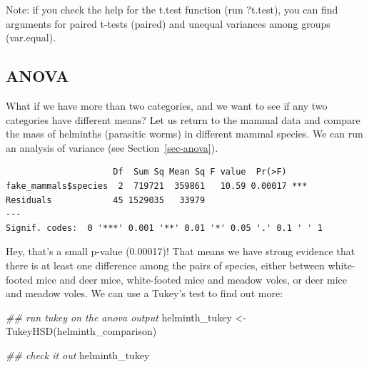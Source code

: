 \documentclass[
  letterpaper,
  DIV=11,
  numbers=noendperiod]{scrreprt}
\newenvironment{Shaded}{\begin{snugshade}}{\end{snugshade}}
\newcommand{\DocumentationTok}[1]{\textcolor[rgb]{0.37,0.37,0.37}{\textit{#1}}}
\newcommand{\FunctionTok}[1]{\textcolor[rgb]{0.28,0.35,0.67}{#1}}
\newcommand{\NormalTok}[1]{\textcolor[rgb]{0.00,0.23,0.31}{#1}}
\newcommand{\OtherTok}[1]{\textcolor[rgb]{0.00,0.23,0.31}{#1}}
\newcommand{\SpecialCharTok}[1]{\textcolor[rgb]{0.37,0.37,0.37}{#1}}
\begin{document}
Note: if you check the help for the t.test function (run ?t.test), you
can find arguments for paired t-tests (paired) and unequal variances
among groups (var.equal).

\subsection{ANOVA}\label{anova}

What if we have more than two categories, and we want to see if any two
categories have different means? Let us return to the mammal data and
compare the mass of helminths (parasitic worms) in different mammal
species. We can run an analysis of variance (see
Section~\ref{sec-anova}).

\begin{Shaded}
\end{Shaded}

\begin{verbatim}
                     Df  Sum Sq Mean Sq F value  Pr(>F)    
fake_mammals$species  2  719721  359861   10.59 0.00017 ***
Residuals            45 1529035   33979                    
---
Signif. codes:  0 '***' 0.001 '**' 0.01 '*' 0.05 '.' 0.1 ' ' 1
\end{verbatim}

Hey, that's a small p-value (0.00017)! That means we have strong
evidence that there is at least one difference among the pairs of
species, either between white-footed mice and deer mice, white-footed
mice and meadow voles, or deer mice and meadow voles. We can use a
Tukey's test to find out more:

\begin{Shaded}
\begin{Highlighting}[]
\DocumentationTok{\#\# run tukey on the anova output}
\NormalTok{helminth\_tukey }\OtherTok{\textless{}{-}} \FunctionTok{TukeyHSD}\NormalTok{(helminth\_comparison)}

\DocumentationTok{\#\# check it out}
\NormalTok{helminth\_tukey}
\end{Highlighting}
\end{Shaded}
\end{document}
